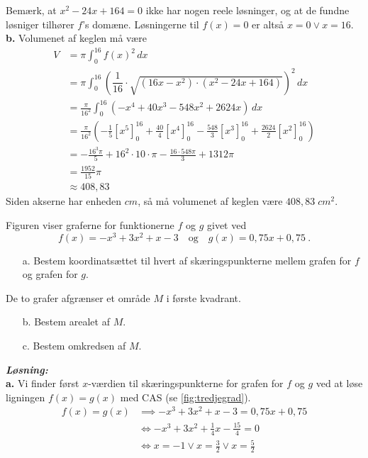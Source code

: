\documentclass{article}
\newcommand{\sol}{\setlength{\parindent}{0cm}\textbf{\textit{Løsning:}}\setlength{\parindent}{1cm}}
\begin{document}
Bemærk, at $x^2-24x+164=0$ ikke har nogen reele løsninger, og at de fundne løsniger tilhører $f$'s domæne. 
Løsningerne til $f(x)= 0$ er altså $x=0 \lor x=16$.\\[1ex]
\textbf{b.}
Volumenet af keglen må være
\begin{equation*}
\begin{split}
  V&=\pi \int_{0}^{16} f(x)^2 \,dx \\ 
  &=\pi \int_{0}^{16} \left(\dfrac{1}{16}\cdot\sqrt{(16x-x^2)\cdot(x^2-24x+164)}\right)^2 \,dx \\ 
  &= \frac{\pi}{16^2} \int_{0}^{16} \left(-x^4+40x^3-548x^2+2624x\right) \,dx \\ 
  &=\frac{\pi}{16^2} \left(-\frac{1}{5}\left[x^5\right]_{0}^{16} + \frac{40}{4}\left[x^4\right]_{0}^{16}- \frac{548}{3}\left[x^3\right]_{0}^{16}+\frac{2624}{2}\left[x^2\right]_{0}^{16}\right) \\ 
  &= -\frac{16^3 \pi}{5} + 16^2 \cdot 10 \cdot \pi -\frac{16 \cdot 548 \pi}{3}+1312 \pi\\ 
  &=\frac{1952}{15} \pi\\ 
  &\approx 408,83
\end{split}
\end{equation*}
Siden akserne har enheden $\unit{cm}$, så må volumenet af keglen være $408,83 \;\unit{cm^2}$.
\begin{question}{}{}
  Figuren viser graferne for funktionerne $f$ og $g$ givet ved
$$f(x)=-x^3+3x^2+x-3\quad\mathrm{og}\quad g(x)=0,75x+0,75\:.$$
\begin{itemize}
  \item[a.] Bestem koordinatsættet til hvert af skæringspunkterne mellem grafen for $f$ og grafen for $g.$
\end{itemize}
De to grafer afgrænser et område $M$ i første kvadrant.
\begin{itemize}
  \item[b.] Bestem arealet af $M.$
  \item[c.] Bestem omkredsen af $M.$
\end{itemize}
\end{question}
\sol \\
\textbf{a.}
Vi finder først $x$-værdien til skæringspunkterne for grafen for $f$ og $g$ ved at løse ligningen $f(x)=g(x)$ med CAS (se \cref{fig:tredjegrad}). 
\begin{equation*}
\begin{split}
  f(x)=g(x) &\implies -x^3+3x^2+x-3=0,75x+0,75\\ 
  &\iff -x^3+3x^2+\frac{1}{4}x-\frac{15}{4}=0\\ 
  &\iff x=-1 \lor x=\frac{3}{2} \lor x=\frac{5}{2}
\end{split}
\end{equation*}
\end{document}
